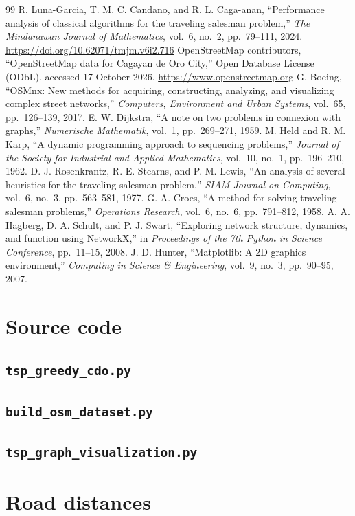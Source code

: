 \documentclass[11pt,a4paper]{article}
\begin{document}
\begin{thebibliography}{99}
 R. Luna-Garcia, T. M. C. Candano, and R. L. Caga-anan, ``Performance analysis of classical algorithms for the traveling salesman problem,'' \emph{The Mindanawan Journal of Mathematics}, vol.~6, no.~2, pp.~79--111, 2024. \url{https://doi.org/10.62071/tmjm.v6i2.716}
 OpenStreetMap contributors, ``OpenStreetMap data for Cagayan de Oro City,'' Open Database License (ODbL), accessed 17 October 2026. \url{https://www.openstreetmap.org}
 G. Boeing, ``OSMnx: New methods for acquiring, constructing, analyzing, and visualizing complex street networks,'' \emph{Computers, Environment and Urban Systems}, vol.~65, pp.~126--139, 2017.
 E. W. Dijkstra, ``A note on two problems in connexion with graphs,'' \emph{Numerische Mathematik}, vol.~1, pp.~269--271, 1959.
 M. Held and R. M. Karp, ``A dynamic programming approach to sequencing problems,'' \emph{Journal of the Society for Industrial and Applied Mathematics}, vol.~10, no.~1, pp.~196--210, 1962.
 D. J. Rosenkrantz, R. E. Stearns, and P. M. Lewis, ``An analysis of several heuristics for the traveling salesman problem,'' \emph{SIAM Journal on Computing}, vol.~6, no.~3, pp.~563--581, 1977.
 G. A. Croes, ``A method for solving traveling-salesman problems,'' \emph{Operations Research}, vol.~6, no.~6, pp.~791--812, 1958.
 A. A. Hagberg, D. A. Schult, and P. J. Swart, ``Exploring network structure, dynamics, and function using NetworkX,'' in \emph{Proceedings of the 7th Python in Science Conference}, pp.~11--15, 2008.
 J. D. Hunter, ``Matplotlib: A 2D graphics environment,'' \emph{Computing in Science \& Engineering}, vol.~9, no.~3, pp.~90--95, 2007.
\end{thebibliography}

\appendix
\section{Source code}\label{app:code}
\subsection{\texttt{tsp\_greedy\_cdo.py}}

\subsection{\texttt{build\_osm\_dataset.py}}

\subsection{\texttt{tsp\_graph\_visualization.py}}


\section{Road distances}
\DistanceMatrix
\end{document}
